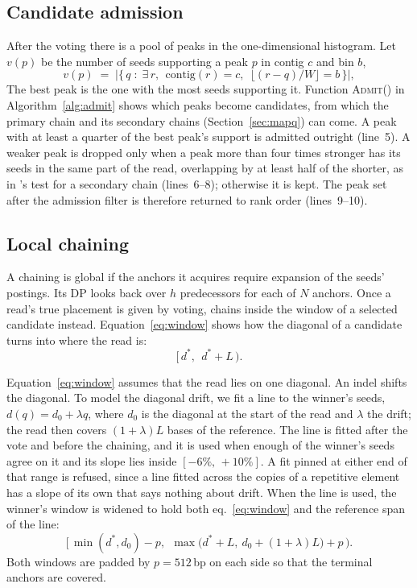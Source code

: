 \subsection{Candidate admission}
\label{sec:admit}

After the voting there is a pool of peaks in the one-dimensional histogram. Let $v(p)$ be the number of seeds supporting a peak $p$ in contig $c$ and bin $b$,
\begin{equation}
v(p) \;=\; \bigl|\{\,q \;:\; \exists\, r,\ \ \text{contig}(r)=c,\ \ \lfloor (r-q)/W\rfloor = b\,\}\bigr|,
\label{eq:support}
\end{equation}
The best peak is the one with the most seeds supporting it. Function \textsc{Admit}() in Algorithm~\ref{alg:admit} shows which peaks become candidates, from which the primary chain and its secondary chains (Section~\ref{sec:mapq}) can come. A peak with at least a quarter of the best peak's support is admitted outright (line~5). A weaker peak is dropped only when a peak more than four times stronger has its seeds in the same part of the read, overlapping by at least half of the shorter, as in \mmtwo{}'s test for a secondary chain (lines~6--8); otherwise it is kept. The peak set after the admission filter is therefore returned to rank order (lines~9--10).


\subsection{Local chaining}
\label{sec:chain}

A chaining is global if the anchors it acquires require expansion of the seeds' postings. Its DP looks back over $h$ predecessors for each of $N$ anchors. Once a read's true placement is given by voting, \flash{} chains inside the window of a selected candidate instead. Equation~\eqref{eq:window} shows how the diagonal of a candidate turns into where the read is:
\begin{equation}
\bigl[\,d^\ast,\ \ d^\ast + L\,\bigr).
\label{eq:window}
\end{equation}

Equation~\eqref{eq:window} assumes that the read lies on one diagonal. An indel shifts the diagonal. To model the diagonal drift, we fit a line to the winner's seeds, $d(q) = d_0 + \lambda q$, where $d_0$ is the diagonal at the start of the read and $\lambda$ the drift; the read then covers $(1+\lambda)L$ bases of the reference. The line is fitted after the vote and before the chaining, and it is used when enough of the winner's seeds agree on it and its slope lies inside $[-6\%,\,+10\%]$. A fit pinned at either end of that range is refused, since a line fitted across the copies of a repetitive element has a slope of its own that says nothing about drift. When the line is used, the winner's window is widened to hold both eq.~\eqref{eq:window} and the reference span of the line:
\begin{equation}
\bigl[\,\min(d^\ast, d_0) - p,\ \ \max\bigl(d^\ast + L,\ d_0 + (1+\lambda)L\bigr) + p\,\bigr).
\label{eq:windowdrift}
\end{equation}
Both windows are padded by $p = 512$\,bp on each side so that the terminal anchors are covered.


